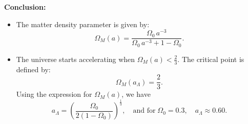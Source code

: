 \documentclass{article}
\begin{document}
\noindent\textbf{Conclusion:}
\begin{itemize}
    \item The matter density parameter is given by:
          \[
          \boxed{\Omega_M(a) = \frac{\Omega_0\,a^{-3}}{\Omega_0\,a^{-3} + 1 - \Omega_0}.}
          \]
    \item The universe starts accelerating when \(\Omega_M(a) < \frac{2}{3}\). The critical point is defined by:
          \[
          \Omega_M(a_\Lambda)=\frac{2}{3}.
          \]
          Using the expression for \(\Omega_M(a)\), we have
          \[
          \boxed{a_\Lambda = \left(\frac{\Omega_0}{2(1-\Omega_0)}\right)^{\frac{1}{3}}, \quad\text{and for}\; \Omega_0 = 0.3,\quad a_\Lambda \approx 0.60.}
          \]
\end{itemize}
\end{document}

